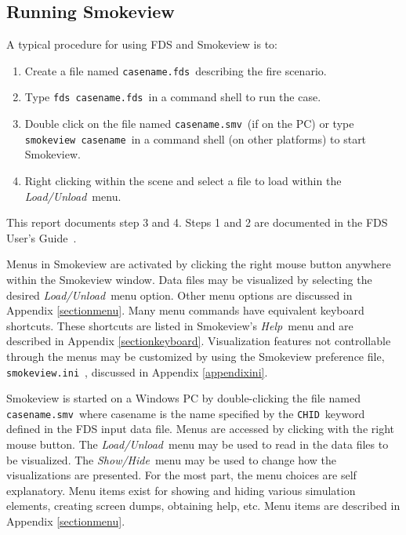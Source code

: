 \documentclass[11pt,twoside]{book}
\newcommand{\svini}{{\tt smokeview.ini}\ }
\begin{document}

\subsection{Running Smokeview}

A typical procedure for using FDS and Smokeview is to:
\begin{enumerate}

\item Create a file named {\tt casename.fds}\ describing the fire
scenario.

\item Type {\tt fds~casename.fds}\ in a command shell to run the
case.

\item Double click on the file named {\tt casename.smv}\ (if on the
PC) or type {\tt smokeview~casename}\ in a command shell (on other
platforms) to start Smokeview.

\item Right clicking within the scene and select a file to load
within the {\em Load/Unload}\ menu.
\end{enumerate}

\noindent This report documents step 3 and 4. Steps 1 and 2 are
documented in the FDS User's Guide~\cite{FDS_Users_Guide}.

Menus in Smokeview are activated by clicking the right mouse
button anywhere within the Smokeview window.  Data files may be
visualized by selecting the desired {\em Load/Unload}\ menu
option. Other menu options are discussed in Appendix
\ref{sectionmenu}. Many menu commands have equivalent keyboard
shortcuts. These shortcuts are listed in Smokeview's {\em Help}\
menu and are described in Appendix \ref{sectionkeyboard}.
Visualization features not controllable through the menus may be
customized by using the Smokeview preference file, \svini,
discussed in Appendix \ref{appendixini}.

Smokeview  is started on a Windows PC by double-clicking the file
named {\tt casename.smv}\ where casename is the name specified by
the {\tt CHID}\ keyword defined in the FDS input data file. Menus
are accessed by clicking with the right mouse button.  The {\em
Load/Unload}\ menu may be used to read in the data files to be
visualized. The {\em Show/Hide}\ menu may be used to change how
the visualizations are presented. For the most part, the menu
choices are self explanatory. Menu items exist for showing and
hiding various simulation elements, creating screen dumps,
obtaining help, etc. Menu items are described in Appendix
\ref{sectionmenu}.
\end{document}
